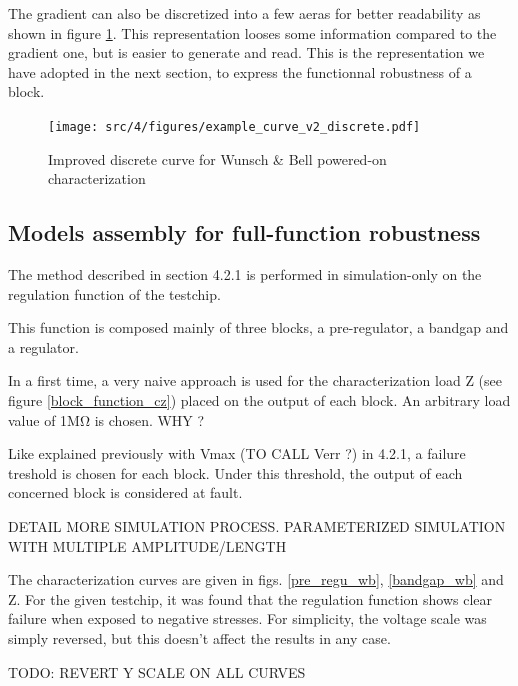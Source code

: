 The gradient can also be discretized into a few aeras for better readability as shown in figure \ref{wb_cz_curve_example_v2_discrete}.
This representation looses some information compared to the gradient one, but is easier to generate and read.
This is the representation we have adopted in the next section, to express the functionnal robustness of a block.

\begin{figure}[!htbp]
  \centering
  \texttt{[image: src/4/figures/example\_curve\_v2\_discrete.pdf]}
  \caption{Improved discrete curve for Wunsch & Bell powered-on characterization}
  \label{wb_cz_curve_example_v2_discrete}
\end{figure}

\subsection{Models assembly for full-function robustness}

The method described in section 4.2.1 is performed in simulation-only on the regulation function of the testchip.

This function is composed mainly of three blocks, a pre-regulator, a bandgap and a regulator.

In a first time, a very naive approach is used for the characterization load Z (see figure \ref{block_function_cz}) placed on the output of each block.
An arbitrary load value of 1MΩ is chosen. WHY ?

Like explained previously with Vmax (TO CALL Verr ?) in 4.2.1, a failure treshold is chosen for each block.
Under this threshold, the output of each concerned block is considered at fault.

DETAIL MORE SIMULATION PROCESS. PARAMETERIZED SIMULATION WITH MULTIPLE AMPLITUDE/LENGTH

The characterization curves are given in figs. \ref{pre_regu_wb}, \ref{bandgap_wb} and Z.
For the given testchip, it was found that the regulation function shows clear failure when exposed to negative stresses.
For simplicity, the voltage scale was simply reversed, but this doesn't affect the results in any case.

TODO: REVERT Y SCALE ON ALL CURVES

